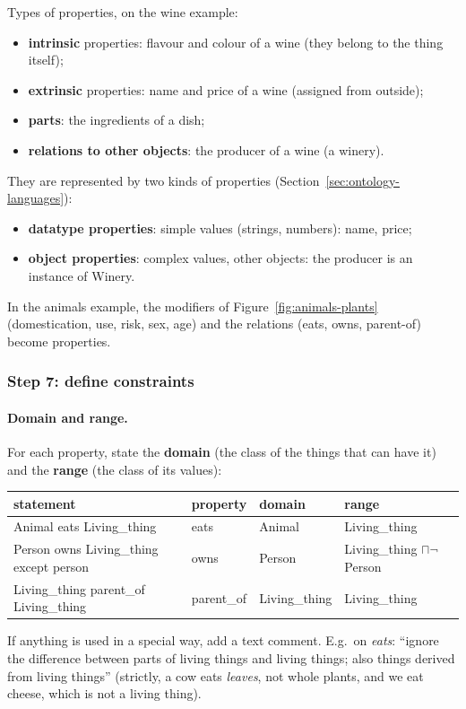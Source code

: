 Types of properties, on the wine example:
\begin{itemize}[nosep]
  \item \textbf{intrinsic} properties: flavour and colour of a wine (they belong to the
        thing itself);
  \item \textbf{extrinsic} properties: name and price of a wine (assigned from outside);
  \item \textbf{parts}: the ingredients of a dish;
  \item \textbf{relations to other objects}: the producer of a wine (a winery).
\end{itemize}
They are represented by two kinds of properties (Section~\ref{sec:ontology-languages}):
\begin{itemize}[nosep]
  \item \textbf{datatype properties}: simple values (strings, numbers): name, price;
  \item \textbf{object properties}: complex values, other objects: the producer is an
        instance of Winery.
\end{itemize}
In the animals example, the modifiers of Figure~\ref{fig:animals-plants} (domestication,
use, risk, sex, age) and the relations (eats, owns, parent-of) become properties.

\subsubsection{Step 7: define constraints}

\paragraph{Domain and range.}
For each property, state the \textbf{domain} (the class of the things that can have it)
and the \textbf{range} (the class of its values):
\begin{center}
\small
\begin{tabularx}{\linewidth}{@{}>{\raggedright\arraybackslash}X l l l@{}}
\toprule
\textbf{statement} & \textbf{property} & \textbf{domain} & \textbf{range} \\
\midrule
Animal eats Living\_thing & eats & Animal & Living\_thing \\
Person owns Living\_thing except person & owns & Person & Living\_thing $\sqcap \neg$Person \\
Living\_thing parent\_of Living\_thing & parent\_of & Living\_thing & Living\_thing \\
\bottomrule
\end{tabularx}
\end{center}
If anything is used in a special way, add a text comment. E.g.\ on \emph{eats}:
``ignore the difference between parts of living things and living things; also things
derived from living things'' (strictly, a cow eats \emph{leaves}, not whole plants, and
we eat cheese, which is not a living thing).


